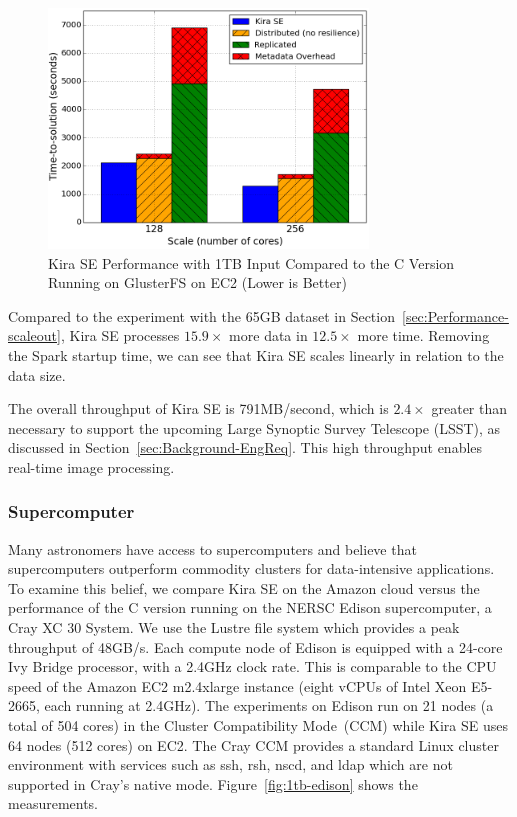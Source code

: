 \documentclass[conference]{IEEEtran}
\newcommand{\up}{\vspace*{-1em}}
\begin{document}
\begin{figure}[t]
	\begin{center}
		\includegraphics[width=85mm]{pictures/1TB-EC2}
		\caption{Kira SE Performance with 1TB Input Compared to the C Version Running on GlusterFS on EC2 (Lower is Better)
		\label{fig:1tb-ec2}}
		\up\up
  	\end{center}
\end{figure}

Compared to the experiment with the 65GB dataset in Section~\ref{sec:Performance-scaleout},
Kira SE processes $15.9\times$ more data in $12.5\times$ more time. Removing the Spark
startup time, we can see that Kira SE scales linearly in relation to the data size.

The overall throughput of Kira SE is 791MB/second, which is $2.4\times$ greater than necessary
to support the upcoming Large Synoptic Survey Telescope (LSST), as discussed in
Section~\ref{sec:Background-EngReq}. This high throughput enables real-time image processing.

\subsubsection{Supercomputer}

Many astronomers have access to supercomputers and believe that
supercomputers outperform commodity clusters for data-intensive applications.
To examine this belief, we compare Kira SE on the Amazon cloud versus the performance of
the C version running on the NERSC Edison supercomputer, a Cray XC 30 System. We use
the Lustre file system which provides a peak throughput of 48GB/s. Each compute
node of Edison is equipped with a 24-core Ivy Bridge processor, with a 2.4GHz clock rate.
This is comparable to the CPU speed of the Amazon EC2 m2.4xlarge instance (eight vCPUs of
Intel Xeon E5-2665, each running at 2.4GHz). The experiments on Edison run on 21
nodes (a total of 504 cores) in the Cluster Compatibility Mode~(CCM)
while Kira SE uses 64 nodes (512 cores) on EC2. The Cray CCM provides a 
standard Linux cluster environment with services such as ssh, rsh, nscd, and ldap which 
are not supported in Cray's native mode.
Figure~\ref{fig:1tb-edison} shows the measurements.
\end{document}
